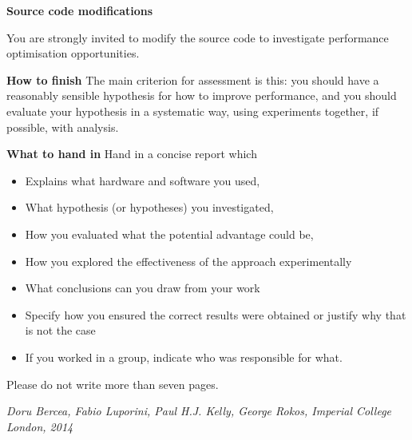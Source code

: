 \documentclass{article}
\begin{document}
\textbf{Source code modifications}

You are strongly invited to modify the source code to investigate performance optimisation opportunities.

\textbf{How to finish}
The main criterion for assessment is this: you should have a reasonably sensible hypothesis for how to improve performance, and you should evaluate your hypothesis in a systematic way, using experiments together, if possible, with analysis.

\textbf{What to hand in}
Hand in a concise report which

\begin{itemize}
\item Explains what hardware and software you used,
\item What hypothesis (or hypotheses) you investigated,
\item How you evaluated what the potential advantage could be,
\item How you explored the effectiveness of the approach experimentally
\item What conclusions can you draw from your work
\item Specify how you ensured the correct results were obtained or justify why that is not the case
\item If you worked in a group, indicate who was responsible for what.
\end{itemize}

Please do not write more than seven pages. 

\bigskip

{\it Doru Bercea, Fabio Luporini, Paul H.J. Kelly, George Rokos, Imperial College London, 2014}
\end{document}
